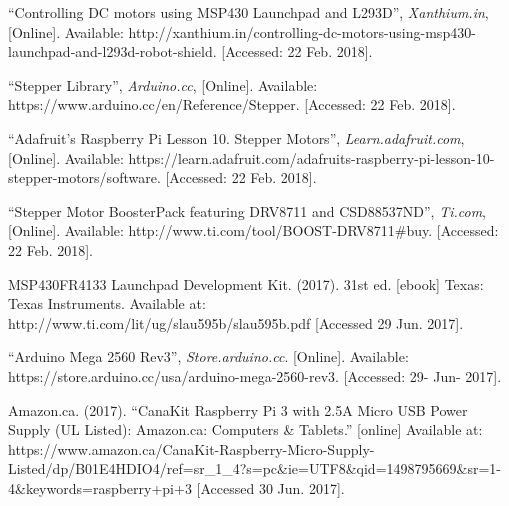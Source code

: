 \documentclass[11pt]{article}
\begin{document}
\begin{thebibliography}{0}
``Controlling DC motors using MSP430 Launchpad and L293D”, \textit{Xanthium.in}, [Online]. Available: http://xanthium.in/controlling-dc-motors-using-msp430-launchpad-and-l293d-robot-shield. [Accessed: 22 Feb. 2018].

``Stepper Library”, \textit{Arduino.cc}, [Online]. Available: https://www.arduino.cc/en/Reference/Stepper. [Accessed: 22 Feb. 2018].

``Adafruit's Raspberry Pi Lesson 10. Stepper Motors”, \textit{Learn.adafruit.com}, [Online]. Available: https://learn.adafruit.com/adafruits-raspberry-pi-lesson-10-stepper-motors/software. [Accessed: 22 Feb. 2018].

``Stepper Motor BoosterPack featuring DRV8711 and CSD88537ND”, \textit{Ti.com}, [Online]. Available: http://www.ti.com/tool/BOOST-DRV8711\#buy. [Accessed: 22 Feb. 2018].

MSP430FR4133 Launchpad Development Kit. (2017). 31st ed. [ebook] Texas: Texas Instruments. Available at: http://www.ti.com/lit/ug/slau595b/slau595b.pdf [Accessed 29 Jun. 2017].

``Arduino Mega 2560 Rev3'', \textit{Store.arduino.cc}. [Online]. Available: https://store.arduino.cc/usa/arduino-mega-2560-rev3. [Accessed: 29- Jun- 2017].

Amazon.ca. (2017). ``CanaKit Raspberry Pi 3 with 2.5A Micro USB Power Supply (UL Listed): Amazon.ca: Computers \& Tablets.'' [online] Available at: https://www.amazon.ca/CanaKit-Raspberry-Micro-Supply-Listed/dp/B01E4HDIO4/ref=sr\_1\_4?s=pc\&ie=UTF8\&qid=1498795669\&sr=1-4\&keywords=raspberry+pi+3 [Accessed 30 Jun. 2017].

\end{thebibliography}
\end{document}
